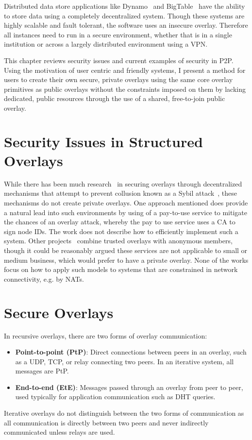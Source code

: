 Distributed data store applications like Dynamo~\cite{dynamo} and
BigTable~\cite{bigtable} have the ability to store data using a completely
decentralized system.  Though these systems are highly scalable and fault
tolerant, the software uses an insecure overlay.  Therefore all instances
need to run in a secure environment, whether that is in a single institution
or across a largely distributed environment using a VPN.

This chapter reviews security issues and current examples of security in P2P.
Using the motivation of user centric and friendly systems, I present a method
for users to create their own secure, private overlays using the same core
overlay primitives as public overlays without the constraints imposed on them
by lacking dedicated, public resources through the use of a shared,
free-to-join public overlay.

\section{Security Issues in Structured Overlays}
While there has been much research~\cite{secure_routing} in securing overlays
through decentralized mechanisms that attempt to prevent collusion known as
a Sybil attack~\cite{sybil}, these mechanisms do not create private overlays.
One approach mentioned does provide a natural lead into such environments by
using of a pay-to-use service to mitigate the chances of an overlay attack,
whereby the pay to use service uses a CA to sign node IDs.  The work does not
describe how to efficiently implement such a system.  Other
projects~\cite{stone, tor} combine trusted overlays with anonymous members,
though it could be reasonably argued these services are not applicable to small
or medium business, which would prefer to have a private overlay.  None of the
works focus on how to apply such models to systems that are constrained in
network connectivity, e.g. by NATs.

\section{Secure Overlays}
\label{secure_overlays}
In recursive overlays, there are two forms of overlay communication:
\begin{itemize}
\item \textbf{Point-to-point (PtP)}:  Direct connections between peers in an
overlay, such as a UDP, TCP, or relay connecting two peers.  In an iterative
system, all messages are PtP.
\item \textbf{End-to-end (EtE)}:  Messages passed through an overlay from
peer to peer, used typically for application communication such as DHT queries.
\end{itemize}
Iterative overlays do not distinguish between the two forms of communication as
all communication is directly between two peers and never indirectly
communicated unless relays are used.


